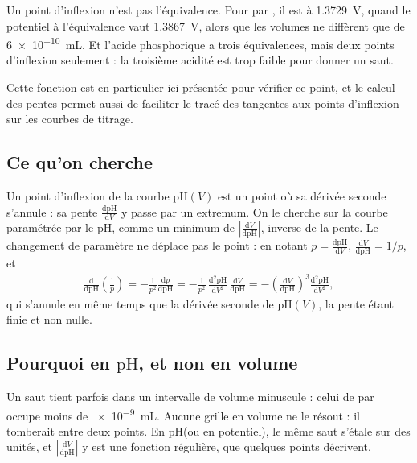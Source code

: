 \documentclass[a4paper,11pt]{article}
\newcommand\logo[1]{\hspace{-12pt}\makebox[12pt][l]{#1}}
\newcommand\rmqcons[1]{\begin{tcolorbox}[rmq, rouge, fontupper=\small\itshape]\logo{\ding{43}}#1\end{tcolorbox}}
\newcommand\rmqattention[1]{\begin{tcolorbox}[rmq, vert]\logo{\faExclamationTriangle}#1\end{tcolorbox}}
\newcommand\pH{\ensuremath{\mathrm{pH}}\xspace}
\newcommand\ddp[2]{\frac{\mathrm{d}#1}{\mathrm{d}#2}}
\newcommand\pare[1]{\left(#1\right)}
\begin{document}
\rmqattention{Un point d'inflexion n'est pas l'équivalence.
Pour \ce{Fe^2+} par \ce{MnO4-}, il est à \qty{1,3729}{V}, quand le potentiel à l'équivalence vaut \qty{1,3867}{V}, alors que les volumes ne diffèrent que de \qty{6e-10}{mL}.
Et l'acide phosphorique a trois équivalences, mais deux points d'inflexion seulement : la troisième acidité est trop faible pour donner un saut.}
\rmqcons{Cette fonction est en particulier ici présentée pour vérifier ce point, et le calcul des pentes permet aussi de faciliter le tracé des tangentes aux points d'inflexion sur les courbes de titrage.}

\subsection{Ce qu'on cherche}
Un point d'inflexion de la courbe $\pH(V)$ est un point où sa dérivée seconde s'annule : sa pente $\ddp\pH V$ y passe par un extremum.
On le cherche sur la courbe paramétrée par le \pH, comme un minimum de $\left|\ddp V\pH\right|$, inverse de la pente.
Le changement de paramètre ne déplace pas le point : en notant $p=\ddp\pH V$, $\ddp V\pH=1/p$, et
\begin{align}
\ddp{}{\pH}\pare{\frac1p}=-\frac1{p^2}\ddp p\pH=-\frac1{p^2}\,\frac{\mathrm d^2\pH}{\mathrm dV^2}\,\ddp V\pH=-\pare{\ddp V\pH}^3\frac{\mathrm d^2\pH}{\mathrm dV^2},
\end{align}
qui s'annule en même temps que la dérivée seconde de $\pH(V)$, la pente étant finie et non nulle.

\subsection{Pourquoi en \pH, et non en volume}
\begin{algo}
Un saut tient parfois dans un intervalle de volume minuscule : celui de  par  occupe moins de \qty{e-9}{mL}.
Aucune grille en volume ne le résout : il tomberait entre deux points.
En \pH (ou en potentiel), le même saut s'étale sur des unités, et $\left|\ddp V\pH\right|$ y est une fonction régulière, que quelques points décrivent.
\end{algo}
\end{document}
